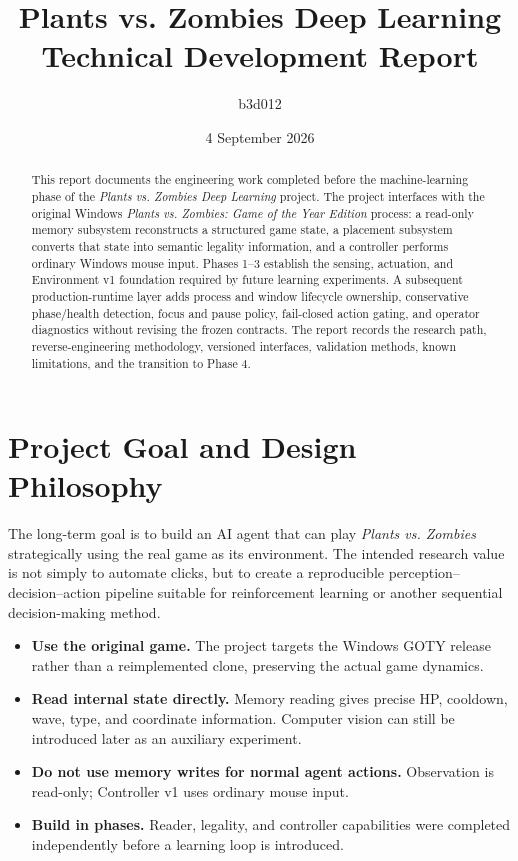 \documentclass[11pt,a4paper]{article}
\title{\textbf{Plants vs. Zombies Deep Learning}\\\large Technical Development Report}
\author{b3d012}
\date{4 September 2026}
\begin{document}
\maketitle
\begin{abstract}
This report documents the engineering work completed before the machine-learning phase of the \emph{Plants vs. Zombies Deep Learning} project. The project interfaces with the original Windows \emph{Plants vs. Zombies: Game of the Year Edition} process: a read-only memory subsystem reconstructs a structured game state, a placement subsystem converts that state into semantic legality information, and a controller performs ordinary Windows mouse input. Phases 1--3 establish the sensing, actuation, and Environment v1 foundation required by future learning experiments. A subsequent production-runtime layer adds process and window lifecycle ownership, conservative phase/health detection, focus and pause policy, fail-closed action gating, and operator diagnostics without revising the frozen contracts. The report records the research path, reverse-engineering methodology, versioned interfaces, validation methods, known limitations, and the transition to Phase 4.
\end{abstract}
\tableofcontents
\newpage
\section{Project Goal and Design Philosophy}
The long-term goal is to build an AI agent that can play \emph{Plants vs. Zombies} strategically using the real game as its environment. The intended research value is not simply to automate clicks, but to create a reproducible perception--decision--action pipeline suitable for reinforcement learning or another sequential decision-making method.
\begin{itemize}
\item \textbf{Use the original game.} The project targets the Windows GOTY release rather than a reimplemented clone, preserving the actual game dynamics.
\item \textbf{Read internal state directly.} Memory reading gives precise HP, cooldown, wave, type, and coordinate information. Computer vision can still be introduced later as an auxiliary experiment.
\item \textbf{Do not use memory writes for normal agent actions.} Observation is read-only; Controller v1 uses ordinary mouse input.
\item \textbf{Build in phases.} Reader, legality, and controller capabilities were completed independently before a learning loop is introduced.
\end{itemize}
\end{document}
